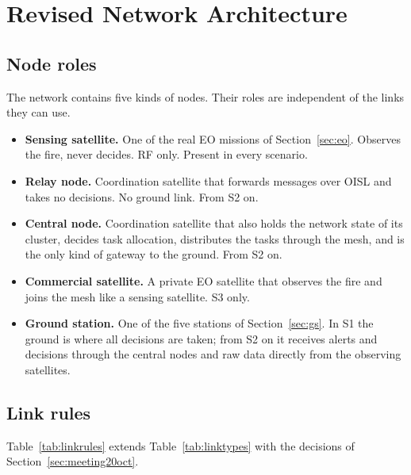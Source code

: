 \documentclass[11pt]{article}
\begin{document}
\section{Revised Network Architecture}\label{sec:architecture}

\subsection{Node roles}\label{subsec:roles}

The network contains five kinds of nodes. Their roles are independent of the links they can use.
\begin{itemize}[leftmargin=1.2cm]
    \item \textbf{Sensing satellite.} One of the real EO missions of Section~\ref{sec:eo}. Observes the fire, never decides. RF only. Present in every scenario.
    \item \textbf{Relay node.} Coordination satellite that forwards messages over OISL and takes no decisions. No ground link. From S2 on.
    \item \textbf{Central node.} Coordination satellite that also holds the network state of its cluster, decides task allocation, distributes the tasks through the mesh, and is the only kind of gateway to the ground. From S2 on.
    \item \textbf{Commercial satellite.} A private EO satellite that observes the fire and joins the mesh like a sensing satellite. S3 only.
    \item \textbf{Ground station.} One of the five stations of Section~\ref{sec:gs}. In S1 the ground is where all decisions are taken; from S2 on it receives alerts and decisions through the central nodes and raw data directly from the observing satellites.
\end{itemize}

\subsection{Link rules}\label{subsec:linkrules}

Table~\ref{tab:linkrules} extends Table~\ref{tab:linktypes} with the decisions of Section~\ref{sec:meeting20oct}.
\end{document}
